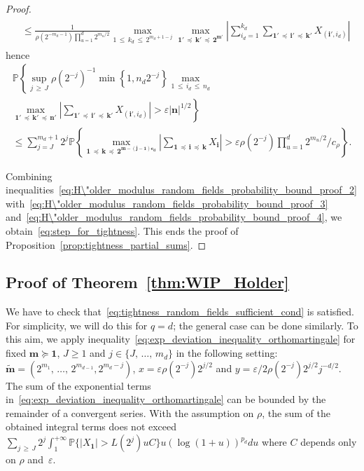 \documentclass[10pt]{amsart}
\theoremstyle{definition}\newtheorem{defi}[theo]{Definition}\newtheorem{rema}[theo]{Remark}\newtheorem{exam}[theo]{Example}\newtheorem{exem}[theo]{Example}\newtheorem{nota}[theo]{Notation}
\newcommand\PP{\mathbb{P}}
\newcommand\ens[1]{\{ #1\}}
\newcommand\abs[1]{|#1|}
\newcommand{\pr}[1]{(#1)}
\newcommand\eps{\varepsilon}
\newcommand{\gr}[1]{\bm{#1}}
\newcommand{\gri}{\bm{i}}
\newcommand{\grn}{\bm{n}}
\newcommand{\grk}{\bm{k}}
\newcommand{\imd}{\preccurlyeq}
\newcommand{\smd}{\succcurlyeq }
\begin{document}
\begin{proof}
\begin{multline*}
\begin{aligned}
&\leq
\frac{1}{\rho\left(2^{-m_{d}-1}\right)\prod_{u=1}^d2^{m_u/2}}
\max_{1\,\leq\,k_d\,\leq\,2^{m_d+1-j}} \max_{\gr{1'}\,\imd\,\gr{k'}\,\imd\,
\gr{2^{m'}}}\left|\sum_{i_d=1}^{k_d}\sum_{\gr{1'}\,\imd\,\gr{i'}\,\imd\,\gr{k'}} X_{\left(\gr{i'},i_d\right)}\right|
\end{aligned}
\end{multline*}
hence
\begin{multline}\label{eq:H\"older_modulus_random_fields_probability_bound_proof_4}
\PP\left\{\sup_{j\,\geqslant\,J}\rho\left(2^{-j}\right)^{-1}
\min\left\{1,n_d2^{-j}\right\}\max_{1\,\leq\,i_d\,\leq \,n_d}\right.\\
\left.\max_{\gr{1'}\,\imd\,\gr{k'}\,\imd\,\gr{n'}} \left|
\sum_{\gr{1'}\,\imd\,\gr{i'}\,\imd\,\gr{k'}} X_{\left(\gr{i'},i_d\right) }\right|>\eps\abs{\grn}^{1/2}\right\}\\
\leq \sum_{j=J}^{m_d+1}2^j \PP\left\{
\max_{\gr{1}\,\imd\,\gr{k}\,\imd\,
\gr{2^{m-\pr{j-1}\gr{e_d}}}}\left|\sum_{\gr{1}\,\imd\,\gr{i}\,\imd\,\grk } X_{\gri}\right|> \eps\rho\left(2^{-j}\right)
\prod_{u=1}^d2^{m_u/2}/c_\rho\right\}.
\end{multline}

Combining inequalities~\eqref{eq:H\"older_modulus_random_fields_probability_bound_proof_2} with~\eqref{eq:H\"older_modulus_random_fields_probability_bound_proof_3} and~\eqref{eq:H\"older_modulus_random_fields_probability_bound_proof_4}, we obtain~\eqref{eq:step_for_tightness}. This ends the proof of Proposition~\ref{prop:tightness_partial_sums}.
\end{proof}

\subsection{Proof of Theorem~\ref{thm:WIP_Holder}}

We have to check that~\eqref{eq:tightness_random_fields_sufficient_cond} is satisfied. For simplicity, we will do this for $q=d$; the general case can be done similarly. To this aim, we apply inequality~\eqref{eq:exp_deviation_inequality_orthomartingale} for fixed $\gr{m}\smd\gr{1}$, $J\geq 1$ and $j\in\ens{J,\,\dots,\,m_d}$ in the following setting: $\widetilde{\gr{m}}=\pr{2^{m_1},\,\dots,\,2^{m_{d-1}},2^{m_d-j}}$, $x=\eps \rho\pr{2^{-j}}2^{j/2}$ and $y= \eps/2\rho\pr{2^{-j}}2^{j/2} j^{-d/2}$. The sum of the exponential terms in~\eqref{eq:exp_deviation_inequality_orthomartingale} can be bounded by the remainder of a convergent series. With the assumption on $\rho$, the sum of the obtained integral terms does not exceed $\sum_{j\,\geq\,J}2^j\int_1^{+\infty}\PP\ens{\abs{X_{\gr{1}}}>L\pr{2^j}uC} u\pr{\log\pr{1+u}}^{p_d}du$ where $C$ depends only on $\rho$ and~$\eps$.
\end{document}
